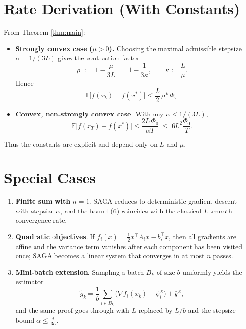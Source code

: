 \documentclass[11pt]{article}
\begin{document}
\section*{Rate Derivation (With Constants)}
From Theorem \ref{thm:main}:
\begin{itemize}
\item \textbf{Strongly convex case ($\mu>0$).}  
Choosing the maximal admissible stepsize $\alpha=1/(3L)$ gives the contraction factor
\[
\rho \;:=\; 1-\frac{\mu}{3L}\;=\;1-\frac{1}{3\kappa},
\qquad \kappa:=\frac{L}{\mu}.
\]
Hence
\[
\mathbb{E}\bigl[f(x_k)-f(x^*)\bigr]\le
\frac{L}{2}\,\rho^{\,k}\,\Phi_0 .
\]
\item \textbf{Convex, non‑strongly convex case.}  
With any $\alpha\le 1/(3L)$,
\[
\mathbb{E}\bigl[f(\bar x_T)-f(x^*)\bigr]\le
\frac{2L\,\Phi_0}{\alpha T}\;\le\;6L^2\frac{\Phi_0}{T}.
\]
\end{itemize}
Thus the constants are explicit and depend only on $L$ and $\mu$.

\section*{Special Cases}
\begin{enumerate}[label=\alph*.]
\item \textbf{Finite sum with $n=1$}.  SAGA reduces to deterministic gradient descent with stepsize $\alpha$, and the bound (6) coincides with the classical $L$‑smooth convergence rate.
\item \textbf{Quadratic objectives}.  If $f_i(x)=\frac12 x^\top A_i x-b_i^\top x$, then all gradients are affine and the variance term vanishes after each component has been visited once; SAGA becomes a linear system that converges in at most $n$ passes.
\item \textbf{Mini‑batch extension}.  Sampling a batch $B_k$ of size $b$ uniformly yields the estimator
\[
\tilde g_k = \frac1b\sum_{i\in B_k}\bigl(\nabla f_i(x_k)-\phi_i^{\,k}\bigr)+\bar g^{\,k},
\]
and the same proof goes through with $L$ replaced by $L/b$ and the stepsize bound $\alpha\le \frac{b}{3L}$.
\end{enumerate}

\newpage
\end{document}
